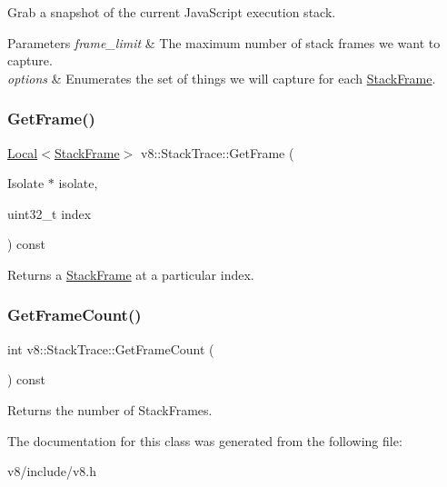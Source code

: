 Grab a snapshot of the current Java\+Script execution stack.


\begin{DoxyParams}{Parameters}
{\em frame\+\_\+limit} & The maximum number of stack frames we want to capture. \\
\hline
{\em options} & Enumerates the set of things we will capture for each \mbox{\hyperlink{classv8_1_1StackFrame}{Stack\+Frame}}. \\
\hline
\end{DoxyParams}
\mbox{\label{classv8_1_1StackTrace_a62d9e32ccc7706716de7c7fd66a18726}} 
\subsubsection{\texorpdfstring{Get\+Frame()}{GetFrame()}}
{\footnotesize\ttfamily \mbox{\hyperlink{classv8_1_1Local}{Local}}$<$\mbox{\hyperlink{classv8_1_1StackFrame}{Stack\+Frame}}$>$ v8\+::\+Stack\+Trace\+::\+Get\+Frame (\begin{DoxyParamCaption}\item[{Isolate $\ast$}]{isolate,  }\item[{uint32\+\_\+t}]{index }\end{DoxyParamCaption}) const}

Returns a \mbox{\hyperlink{classv8_1_1StackFrame}{Stack\+Frame}} at a particular index. \mbox{\label{classv8_1_1StackTrace_a97a2010fa998f963df290062a8157849}} 
\subsubsection{\texorpdfstring{Get\+Frame\+Count()}{GetFrameCount()}}
{\footnotesize\ttfamily int v8\+::\+Stack\+Trace\+::\+Get\+Frame\+Count (\begin{DoxyParamCaption}{ }\end{DoxyParamCaption}) const}

Returns the number of Stack\+Frames. 

The documentation for this class was generated from the following file\+:\begin{DoxyCompactItemize}
\item 
v8/include/v8.\+h\end{DoxyCompactItemize}
